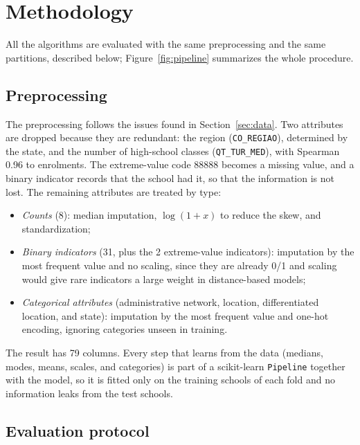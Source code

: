 \section{Methodology}
\label{sec:methodology}

All the algorithms are evaluated with the same preprocessing and the same partitions, described below; Figure~\ref{fig:pipeline} summarizes the whole procedure.



\subsection{Preprocessing}
\label{sec:preprocessing}

The preprocessing follows the issues found in Section~\ref{sec:data}. Two attributes are dropped
because they are redundant: the region (\texttt{CO\_REGIAO}), determined by the state, and the
number of high-school classes (\texttt{QT\_TUR\_MED}), with Spearman 0.96 to enrolments. The
extreme-value code 88888 becomes a missing value, and a binary indicator records that the school
had it, so that the information is not lost. The remaining attributes are treated by type:
\begin{itemize}
  \item \emph{Counts} (8): median imputation, $\log(1+x)$ to reduce the skew, and standardization;
  \item \emph{Binary indicators} (31, plus the 2 extreme-value indicators): imputation by the most
        frequent value and no scaling, since they are already 0/1 and scaling would give rare
        indicators a large weight in distance-based models;
  \item \emph{Categorical attributes} (administrative network, location, differentiated location,
        and state): imputation by the most frequent value and one-hot encoding, ignoring categories
        unseen in training.
\end{itemize}
The result has 79 columns. Every step that learns from the data (medians, modes, means, scales,
and categories) is part of a scikit-learn \texttt{Pipeline} together with the model, so it is
fitted only on the training schools of each fold and no information leaks from the test schools.

\subsection{Evaluation protocol}
\label{sec:protocol}

